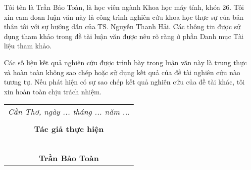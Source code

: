 \documentclass[./thesis.tex]{subfiles}
\begin{document}
{\fontsize{13}{12} \selectfont
Tôi tên là Trần Bảo Toàn, là học viên ngành Khoa học máy tính, khóa 26. Tôi xin cam đoan luận văn này là công trình nghiên cứu khoa học thực sự của bản thân tôi với sự hướng dẫn của TS. Nguyễn Thanh Hải. Các thông tin được sử dụng tham khảo trong đề tài luận văn được nêu rõ ràng ở phần Danh mục Tài liệu tham khảo. 

Các số liệu kết quả nghiên cứu được trình bày trong luận văn này là trung thực và hoàn toàn không sao chép hoặc sử dụng kết quả của đề tài nghiên cứu nào tương tự. Nếu phát hiện có sự sao chép kết quả nghiên cứu của đề tài khác, tôi xin hoàn toàn chịu trách nhiệm.}


{\fontsize{13}{12} \selectfont
\hspace*{\fill}
\begin{tabular}{@{}c@{}} 

\\ \textit{Cần Thơ, ngày ... tháng ... năm ... } \\ \\
\textbf{Tác giả thực hiện}\\ \\
\\
\\
\\
\\
\textbf{Trần Bảo Toàn}
\end{tabular}}
\end{document}
